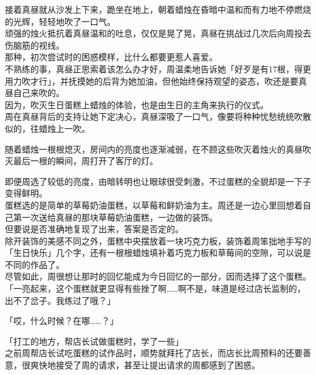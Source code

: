 接着真昼就从沙发上下来，跪坐在地上，朝着蜡烛在昏暗中温和而有力地不停燃烧的光辉，轻轻地吹了一口气。\\

顽强的烛火抵抗着真昼温和的吐息，仅仅是晃了晃，真昼在挑战过几次后向周投去伤脑筋的视线。\\

那种，初次尝试时的困惑模样，比什么都要更惹人喜爱。\\

不熟练的事，真昼正思索着该怎么办才好，周温柔地告诉她「好歹是有17根，得更用力吹才行」，并抚摸她的后背为她加油，但他始终保持观望的姿态，吹还是要真昼自己来吹的。\\

因为，吹灭生日蛋糕上蜡烛的体验，也是由生日的主角来执行的仪式。\\

周在真昼背后的支持让她下定决心，真昼深吸了一口气，像要将种种忧愁统统吹散似的，往蜡烛上一吹。

随着蜡烛一根根熄灭，房间内的亮度也逐渐减弱，在不顾这些吹灭着烛火的真昼吹灭最后一根的瞬间，周打开了客厅的灯。

即便周选了较低的亮度，由暗转明也让眼球很受刺激，不过蛋糕的全貌却是一下子变得鲜明。\\

蛋糕选的是简单的草莓奶油蛋糕，以草莓和鲜奶油为主。周还是一边心里回想着自己第一次送给真昼的那块草莓奶油蛋糕，一边做的装饰。\\

但要说是否准确地复现了出来，答案是否定的。\\

除开装饰的美感不同之外，蛋糕中央摆放着一块巧克力板，装饰着周笨拙地手写的「生日快乐」几个字，还有一根根蜡烛填补着巧克力板和草莓间的空隙，可以说是不同的作品了。\\

尽管如此，周很想让那时的回忆能成为今日回忆的一部分，因而选择了这个蛋糕。\\

「一亮起来，这个蛋糕就更显得有些挫了啊……啊不是，味道是经过店长监制的，出不了岔子。我练过了哦？」

「哎，什么时候？在哪……？」

「打工的地方，帮店长试做蛋糕时，学了一些」\\

之前周帮店长试吃蛋糕的试作品时，顺势就拜托了店长，而店长比周预料的还要善意，很爽快地接受了周的请求，甚至让提出请求的周都感到了困惑。\\

